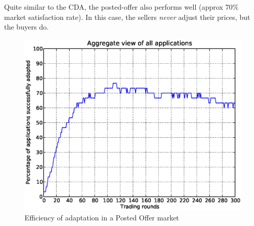 \documentclass[10pt,journal,compsoc]{IEEEtran}
\begin{document}
Quite similar to the CDA, the posted-offer also performs well (approx 70\% market satisfaction rate). In this case, the sellers \textit{never} adjust their prices, but the buyers do. 

\begin{figure}[h]
	\centering
	\includegraphics[scale=0.45]{Figure11.eps}
	\caption{Efficiency of adaptation in a Posted Offer market \label{fig:posted_offer_market_satisfaction}}
\end{figure}
\end{document}
